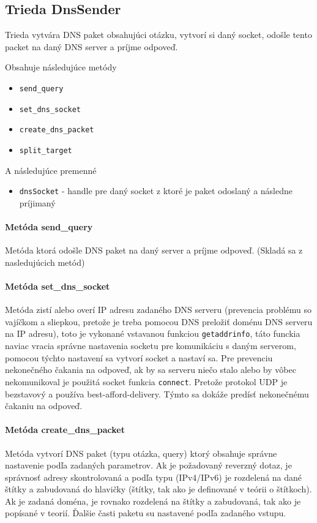 \documentclass[titlepage]{article}
\begin{document}
\subsection{Trieda DnsSender}
Trieda vytvára DNS paket obsahujúci otázku, vytvorí si daný socket, odošle tento packet 
na daný DNS server a príjme odpoveď.

Obsahuje následujúce metódy
\begin{itemize}
   \item \verb|send_query|
   \item \verb|set_dns_socket|
   \item \verb|create_dns_packet|
   \item \verb|split_target|
\end{itemize}

A následujúce premenné
\begin{itemize}
   \item \verb|dnsSocket| - handle pre daný socket z ktoré je paket odoslaný a následne príjimaný 
\end{itemize}

\paragraph{Metóda send\_query}
Metóda ktorá odošle DNS paket na daný server a príjme odpoveď. (Skladá sa z nasledujúcich metód)

\paragraph{Metóda set\_dns\_socket}
Metóda zistí alebo overí IP adresu zadaného DNS serveru (prevencia problému so vajíčkom a sliepkou,
pretože je treba pomocou DNS preložiť doménu DNS serveru na IP adresu), toto je vykonané vstavanou funkciou
\verb|getaddrinfo|, táto funckia naviac vracia správne nastavenia socketu pre komunikáciu s daným 
serverom, pomocou týchto nastavení sa vytvorí socket a nastaví sa. Pre prevenciu nekonečného čakania na odpoveď,
ak by sa serveru niečo stalo alebo by vôbec nekomunikoval je použitá socket funkcia \verb|connect|. Pretože 
protokol UDP je bezstavový a používa best-afford-delivery. Týmto sa dokáže predísť nekonečnému čakaniu na odpoveď.

\paragraph{Metóda create\_dns\_packet}
Metóda vytvorí DNS paket (typu otázka, query) ktorý obsahuje správne nastavenie podľa zadaných parametrov.
Ak je požadovaný reverzný dotaz, je správnosť adresy skontrolovaná a podľa typu (IPv4/IPv6) je rozdelená na dané
štítky a zabudovaná do hlavičky (štítky, tak ako je definované v teórii o štítkoch). Ak je zadaná doména, je rovnako
rozdelená na štítky a zabudovaná, tak ako je popísané v teorií. Ďalšie časti paketu su nastavené podľa zadaného vstupu.
\end{document}
